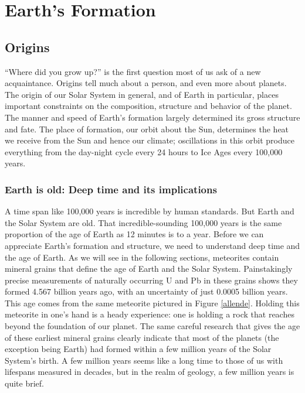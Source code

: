 \section{Earth's Formation}  \label{Earth's Formation}
\subsection{Origins}
``Where did you grow up?'' is the first question most of us ask of a new acquaintance. Origins tell much about a person, and even more about planets. The origin of our Solar System in general, and of Earth in particular, places important constraints on the composition, structure and behavior of the planet. The manner and speed of Earth's formation largely determined its gross structure and fate. The place of formation, our orbit about the Sun, determines the heat we receive from the Sun and hence our climate; oscillations in this orbit produce everything from the day-night cycle every 24 hours to Ice Ages every 100,000 years.

\subsubsection{Earth is old: Deep time and its implications}
A time span like 100,000 years is incredible by human standards. But Earth and the Solar System are old. That incredible-sounding 100,000 years is the same proportion of the age of Earth as 12 minutes is to a year. Before we can appreciate Earth's formation and structure, we need to understand deep time and the age of Earth. As we will see in the following sections, meteorites contain mineral grains that define the age of Earth and the Solar System. Painstakingly precise measurements of naturally occurring U and Pb in these grains shows they formed 4.567 billion years ago, with an uncertainty of just 0.0005 billion years. This age comes from the same meteorite pictured in Figure \ref{allende}. Holding this meteorite in one's hand is a heady experience: one is holding a rock that reaches beyond the foundation of our planet. The same careful research that gives the age of these earliest mineral grains clearly indicate that most of the planets (the exception being Earth) had formed within a few million years of the Solar System's birth. A few million years seems like a long time to those of us with lifespans measured in decades, but in the realm of geology, a few million years is quite brief.\\

